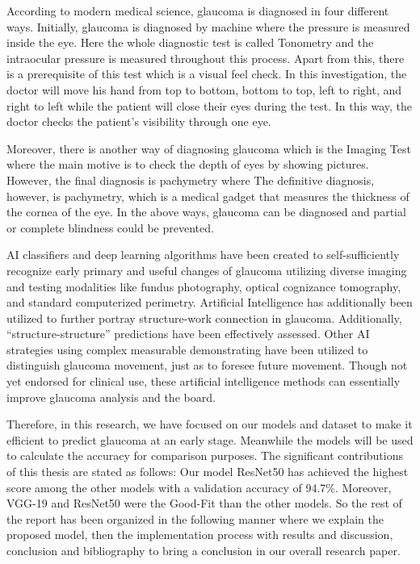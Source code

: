 \vspace{5mm}
\noindent According to modern medical science, glaucoma is diagnosed in four different ways. Initially, glaucoma is diagnosed by machine where the pressure is measured inside the eye. Here the whole diagnostic test is called Tonometry and the intraocular pressure is measured throughout this process. Apart from this, there is a prerequisite of this test which is a visual feel check. In this investigation, the doctor will move his hand from top to bottom, bottom to top, left to right, and right to left while the patient will close their eyes during the test. In this way, the doctor checks the patient’s visibility through one eye.

\vspace{5mm}
\noindent Moreover, there is another way of diagnosing glaucoma which is the Imaging Test where the main motive is to check the depth of eyes by showing pictures. However, the final diagnosis is pachymetry where The definitive diagnosis, however, is pachymetry, which is a medical gadget that measures the thickness of the cornea of the eye. In the above ways, glaucoma can be diagnosed and partial or complete blindness could be prevented.

\vspace{5mm}
\noindent AI classifiers and deep learning algorithms have been created to self-sufficiently recognize early primary and useful changes of glaucoma utilizing diverse imaging and testing modalities like fundus photography, optical cognizance tomography, and standard computerized perimetry. Artificial Intelligence has additionally been utilized to further portray structure-work connection in glaucoma. Additionally, “structure-structure” predictions have been effectively assessed. Other AI strategies using complex measurable demonstrating have been utilized to distinguish glaucoma movement, just as to foresee future movement. Though not yet endorsed for clinical use, these artificial intelligence methods can essentially improve glaucoma analysis and the board.

\vspace{5mm}
\noindent Therefore, in this research, we have focused on our models and dataset to make it efficient to predict glaucoma at an early stage. Meanwhile the models will be used to calculate the accuracy for comparison purposes. The significant contributions of this thesis are stated as follows: Our model ResNet50 has achieved the highest score among the other models with a validation accuracy of 94.7\%. Moreover, VGG-19 and ResNet50 were the Good-Fit than the other models. So the rest of the report has been organized in the following manner where we explain the proposed model, then the implementation process with results and discussion, conclusion and bibliography to bring a conclusion in our overall research paper.


